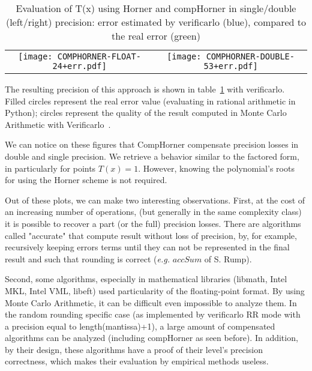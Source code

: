 \begin{table}
\begin{tabular}{cc}
\texttt{[image: COMPHORNER-FLOAT-24+err.pdf]}& 
\texttt{[image: COMPHORNER-DOUBLE-53+err.pdf]}\\
\end{tabular}
  \caption{Evaluation of T(x) using Horner and compHorner in single/double (left/right) precision: error estimated by verificarlo (blue), compared to the real error (green)}
  \label{fig:comphornerVerificarlo24_53}
\end{table}


The resulting precision of this approach is shown in table~\ref{fig:comphornerVerificarlo24_53} with verificarlo.
Filled circles represent the real error value (evaluating in rational arithmetic in Python); circles represent the quality of the result computed in Monte Carlo Arithmetic with Verificarlo~\cite{verrou}.

We can notice on these figures that CompHorner compensate precision losses in double and single precision. We retrieve a behavior similar to the factored form, in particularly for points $T(x)=1$. However, knowing the polynomial's roots for using the Horner scheme is not required.

Out of these plots, we can make two interesting observations.
First, at the cost of an increasing number of operations, (but generally in the same complexity class) it is possible to recover a part (or the full) precision losses. There are algorithms called "accurate" that compute result without loss of precision, by, for example, recursively keeping errors terms until they can not be represented in the final result and such that rounding is correct ({\it e.g.} $accSum$ of S. Rump).

Second, some algorithms, especially in mathematical libraries (libmath, Intel MKL, Intel VML, libeft) used particularity of the floating-point format. By using Monte Carlo Arithmetic, it can be difficult even impossible to analyze them. In the random rounding specific case (as implemented by verificarlo RR mode with a precision equal to length(mantissa)+1), a large amount of compensated algorithms can be analyzed (including compHorner as seen before). In addition, by their design, these algorithms have a proof of their level's precision correctness, which makes their evaluation by empirical methods useless.
